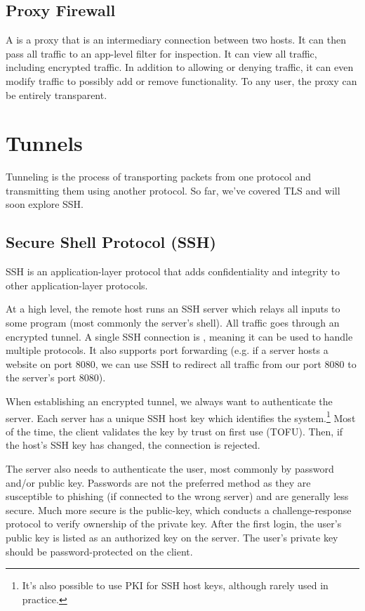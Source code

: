 \subsection*{Proxy Firewall}
A  is a proxy that is an intermediary connection between two hosts. It can then pass all traffic to an app-level filter for inspection. It can view all traffic, including encrypted traffic. In addition to allowing or denying traffic, it can even modify traffic to possibly add or remove functionality. To any user, the proxy can be entirely transparent.

\section{Tunnels}

Tunneling is the process of transporting packets from one protocol and transmitting them using another protocol. So far, we've covered TLS and will soon explore SSH.

\subsection*{Secure Shell Protocol (SSH)}

\begin{dfnbox}{SSH}{}
     is an application-layer protocol that adds confidentiality and integrity to other application-layer protocols.
\end{dfnbox}

At a high level, the remote host runs an SSH server which relays all inputs to some program (most commonly the server's shell). All traffic goes through an encrypted tunnel. A single SSH connection is , meaning it can be used to handle multiple protocols. It also supports port forwarding (e.g. if a server hosts a website on port 8080, we can use SSH to redirect all traffic from our port 8080 to the server's port 8080).

When establishing an encrypted tunnel, we always want to authenticate the server. Each server has a unique SSH host key which identifies the system.\footnote{It's also possible to use PKI for SSH host keys, although rarely used in practice.} Most of the time, the client validates the key by trust on first use (TOFU). Then, if the host's SSH key has changed, the connection is rejected.

The server also needs to authenticate the user, most commonly by password and/or public key. Passwords are not the preferred method as they are susceptible to phishing (if connected to the wrong server) and are generally less secure. Much more secure is the public-key, which conducts a challenge-response protocol to verify ownership of the private key. After the first login, the user's public key is listed as an authorized key on the server. The user's private key should be password-protected on the client.

